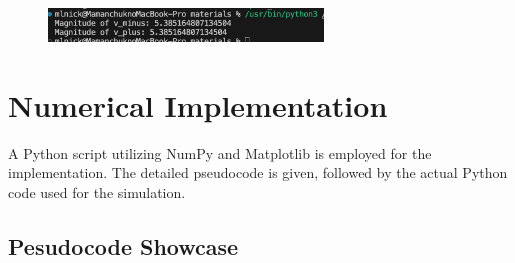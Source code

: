 \documentclass{article}
\begin{document}
\begin{figure}[H] %
    \includegraphics[trim=0 0 0 0, clip, width=0.65\textwidth]{materials/result_1.png} %
    \label{fig:normal}
\end{figure}


\section{Numerical Implementation}
A Python script utilizing NumPy and Matplotlib is employed for the implementation. The detailed pseudocode is given, followed by the actual Python code used for the simulation.

\subsection{Pesudocode Showcase}
\end{document}
